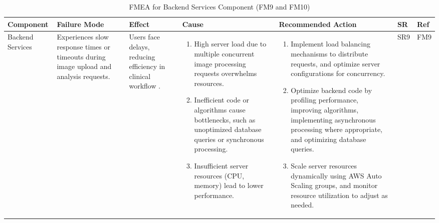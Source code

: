 \documentclass{article}
\begin{document}
\begin{landscape}
    \begin{table}[ht]
    \centering
    \caption{FMEA for Backend Services Component (FM9 and FM10)}
    \renewcommand{\arraystretch}{1.1}
    {
    \setlength{\tabcolsep}{2pt}
    \begin{tabular}{|p{2.5cm}|p{2.5cm}|p{3cm}|p{5cm}|p{6cm}|p{1cm}|p{1cm}|}
    \hline
    \textbf{Component} & \textbf{Failure Mode} & \textbf{Effect} & \textbf{Cause} & \textbf{Recommended Action} & \textbf{SR} & \textbf{Ref} \\
    \hline

    Backend Services
     & Experiences slow response times or timeouts during image upload and analysis requests.
     & Users face delays, reducing efficiency in clinical workflow .
     &
     \begin{enumerate}[leftmargin=*, label={\alph*.}, itemsep=1pt]
         \item High server load due to multiple concurrent image processing requests overwhelms resources.
         \item Inefficient code or algorithms cause bottlenecks, such as unoptimized database queries or synchronous processing.
         \item Insufficient server resources (CPU, memory) lead to lower performance.
     \end{enumerate}
     &
     \begin{enumerate}[leftmargin=*, label={\alph*.}, itemsep=1pt]
         \item Implement load balancing mechanisms to distribute requests, and optimize server configurations for concurrency.
         \item Optimize backend code by profiling performance, improving algorithms, implementing asynchronous processing where appropriate, and optimizing database queries.
         \item Scale server resources dynamically using AWS Auto Scaling groups, and monitor resource utilization to adjust as needed.
     \end{enumerate}
     & SR9 & FM9 \\ \hline


\end{tabular}}
\end{table}
\end{landscape}
\end{document}
